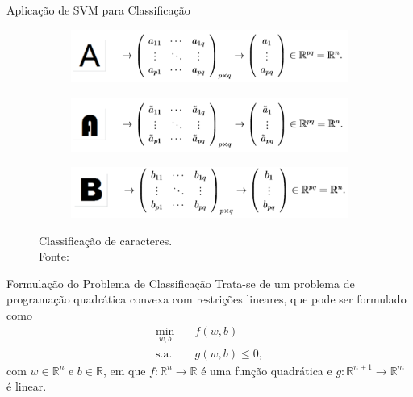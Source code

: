 \documentclass{beamer}
\def\RR{\mathds{R}}
\theoremstyle{definition}%
\begin{document}
\begin{frame}{Aplicação de SVM para Classificação}
\begin{figure}[H]
	\centering
	\begin{subfigure}[h]{0.8\textwidth}
		\centering
		\includegraphics[width=\textwidth]{letraA_1.png}
	\end{subfigure}
	\begin{subfigure}[!h]{0.8\textwidth}
		\centering
		\includegraphics[width=\textwidth]{letraA_2.png}
	\end{subfigure}
	\begin{subfigure}[!h]{0.8\textwidth}
		\centering
		\includegraphics[width=\textwidth]{letraB.png}
	\end{subfigure}
	\caption{Classificação de caracteres. \\ Fonte: \textcite{Evelin2017}}
\end{figure}
\end{frame}


\begin{frame}
\begin{block}{Formulação do Problema de Classificação}
Trata-se de um problema de programação quadrática convexa com restrições lineares, que pode ser formulado como
\[
\begin{aligned}
\min_{w,b} & \quad f(w,b) \\
\text{s.a.} &  \quad g(w,b) \leq 0, \end{aligned}
\]
com $w\in \RR^n$ e $b\in \RR $, em que $f: \RR^n \rightarrow \RR$ é uma função quadrática e $g: \RR^{n+1} \rightarrow \RR^m$ é linear.
\end{block}
\end{frame}
\end{document}
